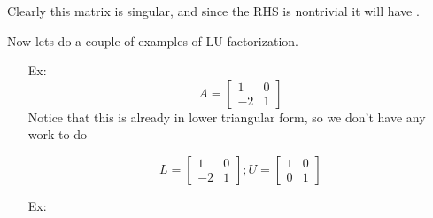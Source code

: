 \documentclass[reqno]{amsart}
\theoremstyle{definition}
\begin{document}
\begin{itemize}
\begin{enumerate}
Clearly this matrix is singular, and since the RHS is nontrivial it will have .

\end{enumerate}


Now lets do a couple of examples of LU factorization.

\begin{enumerate}

\item[Ex:  ]  
%
\begin{equation*}
A = \begin{bmatrix}
1 & 0\\
-2 & 1
\end{bmatrix}
\end{equation*}
%
Notice that this is already in lower triangular form, so we don't have any work to do

\begin{equation*}
L = \begin{bmatrix}
1 & 0\\
-2 & 1
\end{bmatrix};  U = \begin{bmatrix}
1 & 0\\
0 & 1
\end{bmatrix}
\end{equation*}

\item[Ex:  ]  


\end{enumerate}
\end{itemize}
\end{document}
